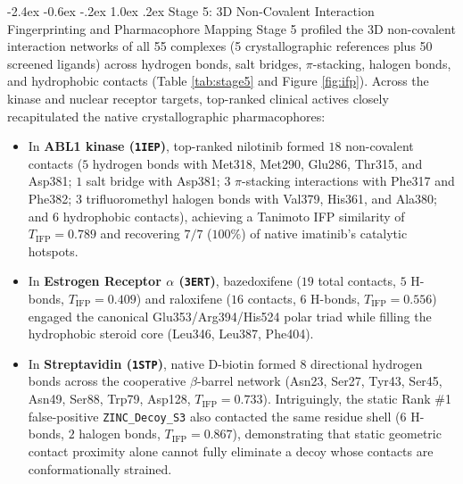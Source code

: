 \documentclass[11pt,a4paper]{article}
\makeatletter
\renewcommand{\subsection}{\@startsection{subsection}{2}{\z@}%
  {-2.4ex \@plus -0.6ex \@minus -.2ex}%
  {1.0ex \@plus .2ex}%
  {\normalfont\large\bfseries\color{primary}}}
\makeatother
\begin{document}
\subsection{Stage 5: 3D Non-Covalent Interaction Fingerprinting and Pharmacophore Mapping}
\noindent Stage 5 profiled the 3D non-covalent interaction networks of all 55 complexes (5 crystallographic references plus 50 screened ligands) across hydrogen bonds, salt bridges, $\pi$-stacking, halogen bonds, and hydrophobic contacts (Table \ref{tab:stage5} and Figure \ref{fig:ifp}). Across the kinase and nuclear receptor targets, top-ranked clinical actives closely recapitulated the native crystallographic pharmacophores:
\begin{itemize}
  \setlength{\itemsep}{3pt}
  \setlength{\parskip}{0pt}
  \item In \textbf{ABL1 kinase (\texttt{1IEP})}, top-ranked nilotinib formed $18$ non-covalent contacts ($5$ hydrogen bonds with Met318, Met290, Glu286, Thr315, and Asp381; $1$ salt bridge with Asp381; $3$ $\pi$-stacking interactions with Phe317 and Phe382; $3$ trifluoromethyl halogen bonds with Val379, His361, and Ala380; and $6$ hydrophobic contacts), achieving a Tanimoto IFP similarity of $T_{\text{IFP}} = 0.789$ and recovering $7/7$ ($100\%$) of native imatinib's catalytic hotspots.
  \item In \textbf{Estrogen Receptor $\alpha$ (\texttt{3ERT})}, bazedoxifene ($19$ total contacts, $5$ H-bonds, $T_{\text{IFP}} = 0.409$) and raloxifene ($16$ contacts, $6$ H-bonds, $T_{\text{IFP}} = 0.556$) engaged the canonical Glu353/Arg394/His524 polar triad while filling the hydrophobic steroid core (Leu346, Leu387, Phe404).
  \item In \textbf{Streptavidin (\texttt{1STP})}, native D-biotin formed $8$ directional hydrogen bonds across the cooperative $\beta$-barrel network (Asn23, Ser27, Tyr43, Ser45, Asn49, Ser88, Trp79, Asp128, $T_{\text{IFP}} = 0.733$). Intriguingly, the static Rank \#1 false-positive \texttt{ZINC\_Decoy\_S3} also contacted the same residue shell ($6$ H-bonds, $2$ halogen bonds, $T_{\text{IFP}} = 0.867$), demonstrating that static geometric contact proximity alone cannot fully eliminate a decoy whose contacts are conformationally strained.
\end{itemize}
\end{document}

